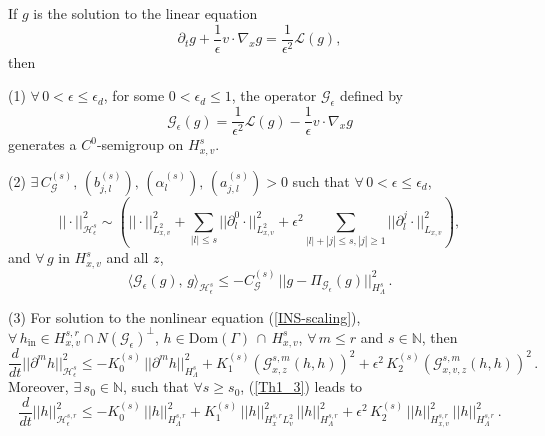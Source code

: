 \documentclass[final,onefignum,onetabnum]{siamart171218}
\begin{document}
\begin{theorem}
\label{thm1}
If $g$ is the solution to the linear equation
\begin{equation}\label{GL}\partial_t g + \frac{1}{\epsilon}v\cdot\nabla_x g = \frac{1}{\epsilon^2} \mathcal L(g), \end{equation} then

(1) $\forall\, 0<\epsilon\leq\epsilon_d$,  for some $0<\epsilon_d\leq 1$,
the operator $\mathcal G_{\epsilon}$ defined by \begin{equation}\label{GE}\mathcal G_{\epsilon}(g)= \frac{1}{\epsilon^2}\mathcal L(g) - \frac{1}{\epsilon} v\cdot\nabla_x g \end{equation}
generates a $C^{0}$-semigroup on $H_{x,v}^{s}$.

(2) $\exists\, C_{\mathcal G}^{(s)}, \, (b_{j,l}^{(s)}), \, (\alpha_l^{(s)}), \, (a_{j,l}^{(s)})>0$ such that $\forall\, 0<\epsilon\leq \epsilon_d$,
$$ ||\cdot||_{\mathcal H_{\epsilon}^s}^2 \sim\left( ||\cdot||_{L^2_{x,v}}^2 + \sum_{|l|\leq s}||\partial_l^{0}\cdot||_{L^2_{x,v}}^2
+\epsilon^2 \sum_{|l|+|j|\leq s, |j|\geq 1}||\partial_l^{j}\cdot||_{L_{x,v}}^2\right), $$
and $\forall\, g$ in $H_{x,v}^{s}$ and all $z$,
$$\langle \mathcal G_{\epsilon}(g), \, g\rangle_{\mathcal H_{\epsilon}^s} \leq -C_{\mathcal G}^{(s)}\, ||g -
\Pi_{\mathcal G_{\epsilon}}(g) ||_{H_{\Lambda}^s}^2\,.$$

(3) For solution to the nonlinear equation (\ref{INS-scaling}), 
$\forall\, h_{\text{in}}\in H_{x,v}^{s,r}\cap N(\mathcal G_{\epsilon})^{\perp}$,
$h\in \text{Dom}(\Gamma)\, \cap\,  H_{x,v}^{s}$, $\forall\, m\leq r$ and $s\in \mathbb N$,
then
\begin{equation}\label{Th1_3}\frac{d}{dt}||\partial^{m}h||_{\mathcal H_{\epsilon}^{s}}^2 \leq - K_0^{(s)}\, ||\partial^{m}h||_{H_{\Lambda}^s}^2
+ K_1^{(s)}\left(\mathcal G_{x,z}^{s,m}(h, h)\right)^2 + \epsilon^2\, K_2^{(s)}\left( \mathcal G_{x,v,z}^{s,m}(h, h)\right)^2\,. \end{equation}
Moreover, $\exists\, s_0\in\mathbb N$, such that $\forall s\geq s_0$, (\ref{Th1_3}) leads to
\begin{equation}\label{Th1_4}\frac{d}{dt}||h||_{\mathcal H_{\epsilon}^{s,r}}^2 \leq -K_0^{(s)}\, ||h||_{H_{\Lambda}^{s,r}}^2
+ K_1^{(s)}\, ||h||_{H_x^{s,r} L_v^2}^2\, ||h||_{H_{\Lambda}^{s,r}}^2 + \epsilon^2\, K_2^{(s)}\, ||h||_{H_{x,v}^{s,r}}^2\,  ||h||_{H_{\Lambda}^{s,r}}^2 \,.
\end{equation}


\end{theorem}
\end{document}
